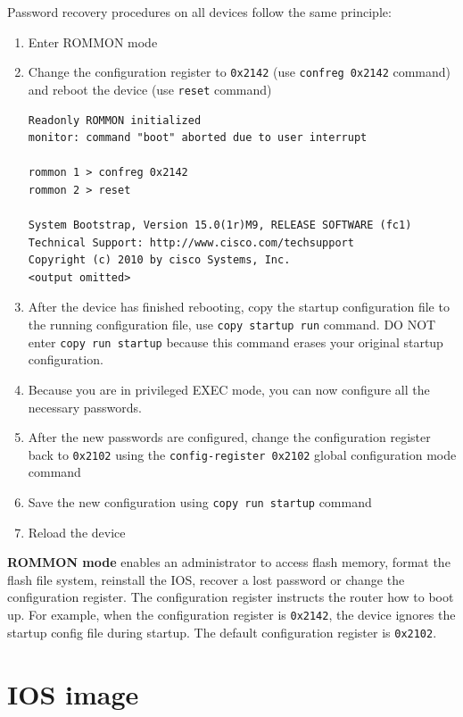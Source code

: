Password recovery procedures on all devices follow the same principle:

\begin{enumerate}
\item Enter ROMMON mode

\item Change the configuration register to \verb|0x2142| (use \verb|confreg 0x2142| command) and reboot the device (use \verb|reset| command)

\begin{verbatim}
Readonly ROMMON initialized
monitor: command "boot" aborted due to user interrupt

rommon 1 > confreg 0x2142
rommon 2 > reset

System Bootstrap, Version 15.0(1r)M9, RELEASE SOFTWARE (fc1)
Technical Support: http://www.cisco.com/techsupport
Copyright (c) 2010 by cisco Systems, Inc.
<output omitted>
\end{verbatim}

\item After the device has finished rebooting, copy the startup configuration file to the running configuration file, use \verb|copy startup run| command. DO NOT enter \verb|copy run startup| because this command erases your original startup configuration.

\item Because you are in privileged EXEC mode, you can now configure all the necessary passwords.

\item After the new passwords are configured, change the configuration register back to \verb|0x2102| using the \verb|config-register 0x2102| global configuration mode command

\item Save the new configuration using \verb|copy run startup| command

\item Reload the device
\end{enumerate}

\textbf{ROMMON mode} enables an administrator to access flash memory, format the flash file system, reinstall the IOS, recover a lost password or change the configuration register. The configuration register instructs the router how to boot up. For example, when the configuration register is \verb|0x2142|, the device ignores the startup config file during startup. The default configuration register is \verb|0x2102|.

\section{IOS image}

